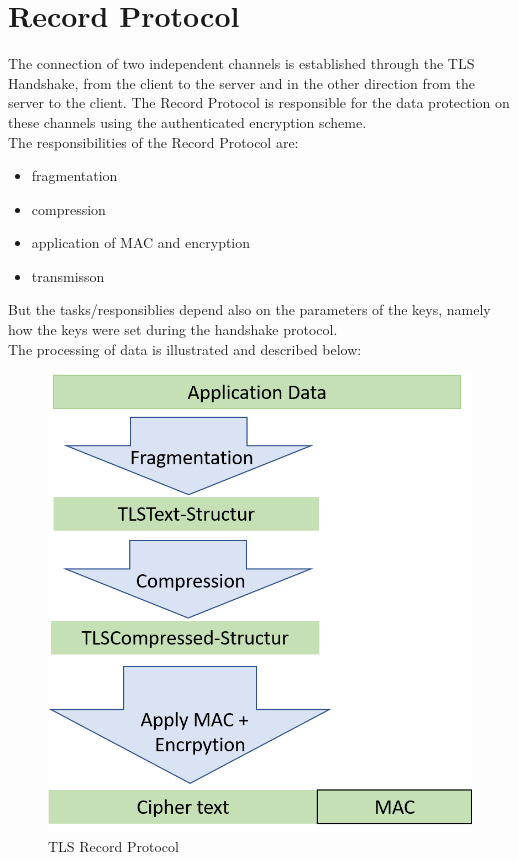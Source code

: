 \section{Record Protocol}
\label{sec:record_protocol}

The connection of two independent channels is established through the TLS Handshake, from the client to the server and in the other direction from the server to the client. The Record Protocol is responsible for the data protection on these channels using the authenticated encryption scheme.\\
The responsibilities of the Record Protocol are:
\begin{itemize}
	\item fragmentation
	\item compression
	\item application of MAC and encryption
	\item transmisson 
\end{itemize}
But the tasks/responsiblies depend also on the parameters of the keys, namely how the keys were set during the handshake protocol. \\
The processing of data is illustrated and described below:      

\begin{figure}[H]
	\centering
		\includegraphics[scale=0.5]{images/tls_recordprotocol.png}
	\caption{TLS Record Protocol}
	\label{fig:tls_recordprotocol}
\end{figure}

